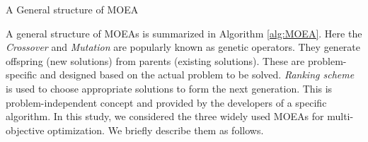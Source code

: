 \begin{algorithm}[!htbp]
	\caption{A General structure of MOEA}
	\label{alg:MOEA}
	\begin{algorithmic}[1]
		\ENDWHILE
	\end{algorithmic}
\end{algorithm}

A general structure of MOEAs is summarized in Algorithm \ref{alg:MOEA}. Here the \textit{Crossover} and \textit{Mutation} are popularly known as genetic operators. They generate offspring (new solutions) from parents (existing solutions). These are problem-specific and designed based on the actual problem to be solved. \textit{Ranking scheme} is used to choose appropriate solutions to form the next generation. This is problem-independent concept and provided by the developers of a specific algorithm. In this study, we considered the three widely used MOEAs for multi-objective optimization. We briefly describe them as follows.

